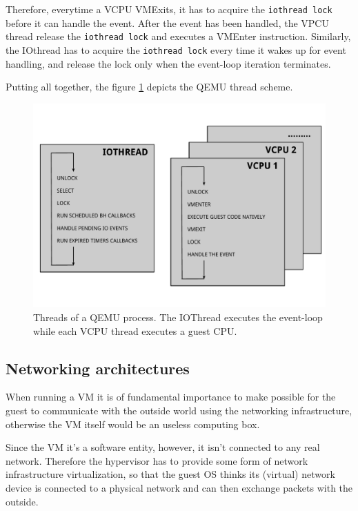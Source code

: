 Therefore, everytime a VCPU VMExits, it has to acquire the \texttt{iothread lock} before it can handle the event. After the event has been
handled, the VPCU thread release the \texttt{iothread lock} and executes a VMEnter instruction.
Similarly, the IOthread has to acquire the \texttt{iothread lock} every time it wakes up for event handling, and release the lock
only when the event-loop iteration terminates.

Putting all together, the figure \ref{fig:qemuthreads} depicts the QEMU thread scheme.

\begin{figure}[bt]
\centering
\includegraphics[scale = 0.45]{qemu-threads.pdf}
\caption{Threads of a QEMU process. The IOThread executes the event-loop while each VCPU thread executes a guest CPU.}
\label{fig:qemuthreads}
\end{figure}



\subsection{Networking architectures}
\label{sec:qemunet}
When running a VM it is of fundamental importance to make possible for the guest to communicate with the outside world using the
networking infrastructure, otherwise the VM itself would be an useless computing box.

Since the VM it's a software entity, however, it isn't connected to any real network. Therefore the hypervisor has to provide some
form of network infrastructure virtualization, so that the guest OS thinks its (virtual) network device is connected to a physical
network and can then exchange packets with the outside.

